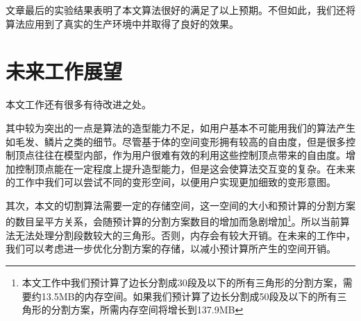     文章最后的实验结果表明了本文算法很好的满足了以上预期。不但如此，我们还将算法应用到了真实的生产环境中并取得了良好的效果。

\section{未来工作展望}
    本文工作还有很多有待改进之处。

    其中较为突出的一点是算法的造型能力不足，如用户基本不可能用我们的算法产生如毛发、鳞片之类的细节。尽管基于体的空间变形拥有较高的自由度，但是很多控制顶点往往在模型内部，作为用户很难有效的利用这些控制顶点带来的自由度。增加控制顶点能在一定程度上提升造型能力，但是这会使算法交互变的复杂。在未来的工作中我们可以尝试不同的变形空间，以便用户实现更加细致的变形意图。

    其次，本文的切割算法需要一定的存储空间，这一空间的大小和预计算的分割方案的数目呈平方关系，会随预计算的分割方案数目的增加而急剧增加\footnote{本文工作中我们预计算了边长分割成30段及以下的所有三角形的分割方案，需要约13.5MB的内存空间。如果我们预计算了边长分割成50段及以下的所有三角形的分割方案，所需内存空间将增长到137.9MB}。所以当前算法无法处理分割段数较大的三角形。否则，内存会有较大开销。在未来的工作中，我们可以考虑进一步优化分割方案的存储，以减小预计算所产生的空间开销。
